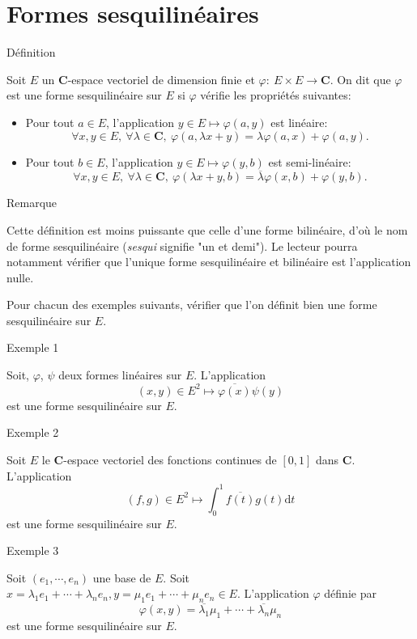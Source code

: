 \documentclass[a4paper,11pt]{article}
\newcommand{\C}{\mathbf{C}}
\newenvironment{gbar}[1]{%
		\def\FrameCommand{{\color{#1}\vrule width 3pt }
		\colorbox{gris2}} %
		\MakeFramed{\advance\hsize -\width\FrameRestore}} %
		{\endMakeFramed}
\newenvironment{cadre}[2]{
		\begin{bclogo}[couleur = gris , barre = none , noborder = true , logo=\vspace{1em}]{
			\hspace{.14em}
			\colorbox{#1}{
				\parbox{15em}{
				\sffamily\normalsize{\color{gris}#2}
			}}
			\vspace{.2em}
		}
			\begin{gbar}{#1}
	}
	{
			\end{gbar}
		\end{bclogo}
	}
\begin{document}
\section{Formes sesquilinéaires}
\begin{cadre}{bleu}{Définition}
Soit $E$ un $\C$-espace vectoriel de dimension finie et $\varphi:\ E\times E\rightarrow\C$. On dit que $\varphi$ est une {\sffamily\color{bleu}forme sesquilinéaire} sur $E$ si $\varphi$ vérifie les propriétés suivantes:
\begin{itemize}[label={\color{bleu}•}]
\item Pour tout $a\in E$, l'application $y\in E\mapsto\varphi(a,y)$ est linéaire:
\[\forall x,y\in E,\ \forall\lambda\in\C,\ \varphi(a,\lambda x+y)=\lambda\varphi(a,x)+\varphi(a,y).\]
\item Pour tout $b\in E$, l'application $y\in E\mapsto\varphi(y,b)$ est semi-linéaire:
\[\forall x,y\in E,\ \forall\lambda\in\C,\ \varphi(\lambda x+y,b)=\overline{\lambda}\varphi(x,b)+\varphi(y,b).\]
\end{itemize}
\end{cadre}
\begin{cadre}{noir}{Remarque}
Cette définition est moins puissante que celle d'une forme bilinéaire, d'où le nom de forme sesquilinéaire (\textit{sesqui} signifie "un et demi"). Le lecteur pourra notamment vérifier que l'unique forme sesquilinéaire et bilinéaire est l'application nulle.
\end{cadre}

Pour chacun des exemples suivants, vérifier que l'on définit bien une forme sesquilinéaire sur $E$.
\begin{cadre}{vert2}{Exemple 1}
 Soit, $\varphi$, $\psi$ deux formes linéaires sur $E$. L'application \[(x,y)\in E^2\mapsto\overline{\varphi(x)}\psi(y)\] est une forme sesquilinéaire sur $E$.
\end{cadre}
\begin{cadre}{vert2}{Exemple 2}
Soit $E$ le $\C$-espace vectoriel des fonctions continues de $[0,1]$ dans $\C$. L'application \[(f,g)\in E^2\mapsto\displaystyle\int_{0}^1\overline{f(t)}g(t)\mathrm{d}t\] est une forme sesquilinéaire sur $E$.
\end{cadre}
\begin{cadre}{vert2}{Exemple 3}
Soit $(e_1,\cdots, e_n)$ une base de $E$. Soit $x=\lambda_1e_1+\cdots+\lambda_ne_n,y=\mu_1e_1+\cdots+\mu_ne_n\in E$. L'application $\varphi$ définie par  \[\varphi(x,y)=\overline{\lambda_1}\mu_1+\cdots+\overline{\lambda_n}\mu_n\] est une forme sesquilinéaire sur $E$.
\end{cadre}
\end{document}
